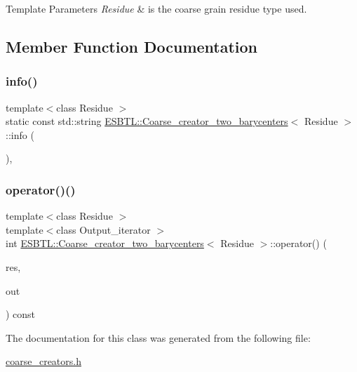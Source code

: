 \begin{DoxyTemplParams}{Template Parameters}
{\em Residue} & is the coarse grain residue type used. \\
\hline
\end{DoxyTemplParams}


\subsection{Member Function Documentation}
\mbox{\label{classESBTL_1_1Coarse__creator__two__barycenters_a341b961a5e6a8a14b78c84ea9688a1d5}} 
\subsubsection{\texorpdfstring{info()}{info()}}
{\footnotesize\ttfamily template$<$class Residue $>$ \\
static const std\+::string \hyperlink{classESBTL_1_1Coarse__creator__two__barycenters}{E\+S\+B\+T\+L\+::\+Coarse\+\_\+creator\+\_\+two\+\_\+barycenters}$<$ Residue $>$\+::info (\begin{DoxyParamCaption}{ }\end{DoxyParamCaption})\hspace{0.3cm}{\ttfamily [inline]}, {\ttfamily [static]}}

\mbox{\label{classESBTL_1_1Coarse__creator__two__barycenters_a1de8d90f25b81d0634625a221609a7f7}} 
\subsubsection{\texorpdfstring{operator()()}{operator()()}}
{\footnotesize\ttfamily template$<$class Residue $>$ \\
template$<$class Output\+\_\+iterator $>$ \\
int \hyperlink{classESBTL_1_1Coarse__creator__two__barycenters}{E\+S\+B\+T\+L\+::\+Coarse\+\_\+creator\+\_\+two\+\_\+barycenters}$<$ Residue $>$\+::operator() (\begin{DoxyParamCaption}\item[{const Residue \&}]{res,  }\item[{Output\+\_\+iterator}]{out }\end{DoxyParamCaption}) const\hspace{0.3cm}{\ttfamily [inline]}}



The documentation for this class was generated from the following file\+:\begin{DoxyCompactItemize}
\item 
\hyperlink{coarse__creators_8h}{coarse\+\_\+creators.\+h}\end{DoxyCompactItemize}

